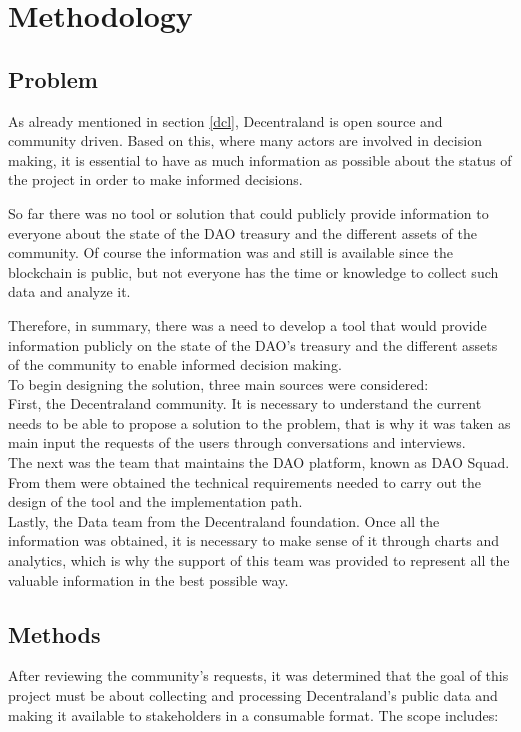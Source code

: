 \documentclass[MSE,Master,english]{twbook}%
\begin{document}
\chapter{Methodology}
\section{Problem}
As already mentioned in section \ref{dcl}, Decentraland is open source and community driven. Based on this, where many actors are involved in decision making, it is essential to have as much information as possible about the status of the project in order to make informed decisions.

So far there was no tool or solution that could publicly provide information to everyone about the state of the DAO treasury and the different assets of the community. Of course the information was and still is available since the blockchain is public, but not everyone has the time or knowledge to collect such data and analyze it.

Therefore, in summary, there was a need to develop a tool that would provide information publicly on the state of the DAO's treasury and the different assets of the community to enable informed decision making. \\

To begin designing the solution, three main sources were considered: \\

First, the Decentraland community. It is necessary to understand the current needs to be able to propose a solution to the problem, that is why it was taken as main input the requests of the users through conversations and interviews. \\

The next was the team that maintains the DAO platform, known as DAO Squad. From them were obtained the technical requirements needed to carry out the design of the tool and the implementation path. \\

Lastly, the Data team from the Decentraland foundation. Once all the information was obtained, it is necessary to make sense of it through charts and analytics, which is why the support of this team was provided to represent all the valuable information in the best possible way.

\section{Methods\label{methods}}
After reviewing the community's requests, it was determined that the goal of this project must be about collecting and processing Decentraland's public data and making it available to stakeholders in a consumable format. The scope includes:
\end{document}
